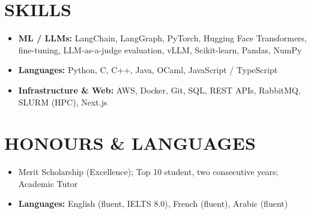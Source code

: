 \documentclass[10pt, a4paper]{article}
\begin{document}
\section*{SKILLS}
\begin{itemize}
    \item \textbf{ML / LLMs:} LangChain, LangGraph, PyTorch, Hugging Face Transformers, fine-tuning, LLM-as-a-judge evaluation, vLLM, Scikit-learn, Pandas, NumPy
    \item \textbf{Languages:} Python, C, C++, Java, OCaml, JavaScript / TypeScript
    \item \textbf{Infrastructure \& Web:} AWS, Docker, Git, SQL, REST APIs, RabbitMQ, SLURM (HPC), Next.js
\end{itemize}

\section*{HONOURS \& LANGUAGES}
\begin{itemize}
    \item Merit Scholarship (Excellence); Top 10 student, two consecutive years; Academic Tutor
    \item \textbf{Languages:} English (fluent, IELTS 8.0), French (fluent), Arabic (fluent)
\end{itemize}
\end{document}
